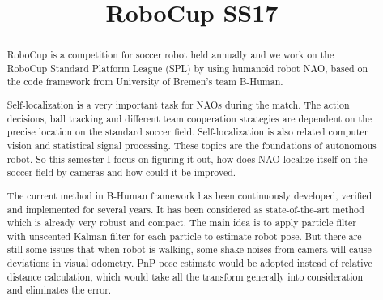 \documentclass[ICS, PP, english, final]{ICS_thesis}
\begin{document}
\title{RoboCup SS17}


\maketitle



\phantom{u}
\begin{abstract}
RoboCup is a competition for soccer robot held annually and we work on the RoboCup Standard Platform League (SPL) by using humanoid robot NAO, based on the code framework from University of Bremen's team B-Human.

Self-localization is a very important task for NAOs during the match. The action decisions, ball tracking and different team cooperation strategies are dependent on the precise location on the standard soccer field. Self-localization is also related computer vision and statistical signal processing. These topics are the foundations of autonomous robot. So this semester I focus on figuring it out, how does NAO localize itself on the soccer field by cameras and how could it be improved.

The current method in B-Human framework has been continuously developed, verified and implemented for several years. It has been considered as state-of-the-art method which is already very robust and compact. The main idea is to apply particle filter with unscented Kalman filter for each particle to estimate robot pose. But there are still some issues that when robot is walking, some shake noises from camera will cause deviations in visual odometry. PnP pose estimate would be adopted instead of relative distance calculation, which would take all the transform generally into consideration and eliminates the error.
\end{abstract}

\phantom{u}
\phantom{1}\vspace{6cm}
\begin{center}
\end{center}
\end{document}
